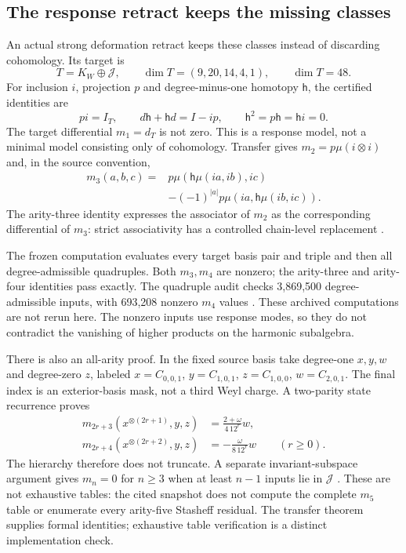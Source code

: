 \documentclass[11pt,a4paper]{article}
\begin{document}
\subsection{The response retract keeps the missing classes}
\label{sec:response-retract}
An actual strong deformation retract keeps these classes instead of
discarding cohomology. Its target is
\[
 T=K_W\oplus\mathcal J,\qquad
 \dim T=(9,20,14,4,1),\qquad\dim T=48.
\]
For inclusion \(i\), projection \(p\) and degree-minus-one homotopy
\(\mathsf h\), the certified identities are
\[
 pi=I_T,\qquad d\mathsf h+\mathsf h d=I-ip,
 \qquad \mathsf h^2=p\mathsf h=\mathsf h i=0.
\]
The target differential \(m_1=d_T\) is not zero. This is a response
model, not a minimal model consisting only of cohomology. Transfer gives
\(m_2=p\mu(i\otimes i)\) and, in the source convention,
\begin{align*}
 m_3(a,b,c)={}&p\mu(\mathsf h\mu(ia,ib),ic)\\
 &-(-1)^{|a|}p\mu(ia,\mathsf h\mu(ib,ic)).
\end{align*}
The arity-three identity expresses the associator of \(m_2\) as the
corresponding differential of \(m_3\): strict associativity has a
controlled chain-level replacement \cite{CBFResponseMthree2026}.

The frozen computation evaluates every target basis pair and triple and
then all degree-admissible quadruples. Both \(m_3,m_4\) are nonzero;
the arity-three and arity-four identities pass exactly. The quadruple
audit checks 3,869,500 degree-admissible inputs, with 693,208 nonzero
\(m_4\) values \cite{CBFResponseMfour2026}. These archived computations
are not rerun here. The nonzero inputs use response modes, so they do not
contradict the vanishing of higher products on the harmonic subalgebra.

There is also an all-arity proof. In the fixed source basis take
degree-one \(x,y,w\) and degree-zero \(z\), labeled
\(x=C_{0,0,1}\), \(y=C_{1,0,1}\), \(z=C_{1,0,0}\), \(w=C_{2,0,1}\).
The final index is an exterior-basis mask, not a third Weyl charge.
A two-parity state recurrence proves
\begin{align*}
 m_{2r+3}(x^{\otimes(2r+1)},y,z)&=\frac{2+\omega}{4\,12^r}w,\\
 m_{2r+4}(x^{\otimes(2r+2)},y,z)&=-\frac{\omega}{8\,12^r}w
 \qquad(r\geq0).
\end{align*}
The hierarchy therefore does not truncate. A separate invariant-subspace
argument gives \(m_n=0\) for \(n\geq3\) when at least \(n-1\) inputs
lie in \(\mathcal J\) \cite{CBFHigherTransfer2026}. These are not
exhaustive tables: the cited snapshot does not compute the complete
\(m_5\) table or enumerate every arity-five Stasheff residual. The
transfer theorem supplies formal identities; exhaustive table verification
is a distinct implementation check.
\end{document}
